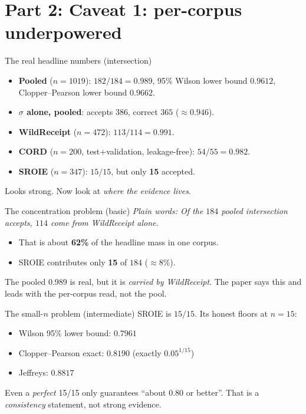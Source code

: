 \documentclass[aspectratio=169]{beamer}
\newcommand{\poolN}{1019}
\newcommand{\poolSigA}{386}
\newcommand{\poolSigC}{365}
\newcommand{\poolIntA}{184}
\newcommand{\poolIntC}{182}
\newcommand{\wrN}{472}
\newcommand{\wrIntA}{114}
\newcommand{\wrIntC}{113}
\newcommand{\rgSroieCPlo}{0.8190}
\newcommand{\rgSroieJeff}{0.8817}
\newcommand{\rgSroieWil}{0.7961}
\newcommand{\rgPoolWil}{0.9612}
\newcommand{\rgPoolCPlo}{0.9662}
\newcommand{\keybox}[1]{\begin{center}\colorbox{grey!15}{\parbox{0.92\linewidth}{\centering #1}}\end{center}}
\newcommand{\plain}[1]{\textit{\textcolor{sig}{Plain words:} #1}}
\begin{document}
\section{Part 2: Caveat 1: per-corpus underpowered}
\begin{frame}{The real headline numbers (intersection)}
\begin{itemize}
\item \textbf{Pooled} ($n{=}\poolN$): $\poolIntC/\poolIntA = 0.989$,
95\% Wilson lower bound \textbf{$\rgPoolWil$}, Clopper--Pearson lower
bound $\rgPoolCPlo$.
\item \textbf{$\sigma$ alone, pooled}: accepts $\poolSigA$, correct
$\poolSigC$ ($\approx 0.946$).
\item \textbf{WildReceipt} ($n{=}\wrN$): $\wrIntC/\wrIntA = 0.991$.
\item \textbf{CORD} ($n{=}200$, test+validation, leakage-free):
$54/55 = 0.982$.
\item \textbf{SROIE} ($n{=}347$): $15/15$, but only \textbf{15}
accepted.
\end{itemize}
\keybox{Looks strong. Now look at \emph{where the evidence lives}.}
\end{frame}

\begin{frame}{The concentration problem (basic)}
\plain{Of the $\poolIntA$ pooled intersection accepts, \textbf{$\wrIntA$}
come from WildReceipt alone.}
\vspace{0.6em}
\begin{itemize}
\item That is about \textbf{62\%} of the headline mass in one corpus.
\item SROIE contributes only \textbf{15} of $\poolIntA$ ($\approx 8\%$).
\end{itemize}
\keybox{The pooled 0.989 is real, but it is \emph{carried by
WildReceipt}. The paper says this and leads with the per-corpus read,
not the pool.}
\end{frame}

\begin{frame}{The small-$n$ problem (intermediate)}
SROIE is $15/15$. Its honest floors at $n{=}15$:
\begin{itemize}
\item Wilson 95\% lower bound: \textbf{$\rgSroieWil$}
\item Clopper--Pearson exact: \textbf{$\rgSroieCPlo$} (exactly
$0.05^{1/15}$)
\item Jeffreys: \textbf{$\rgSroieJeff$}
\end{itemize}
\vspace{0.4em}
\keybox{Even a \emph{perfect} 15/15 only guarantees ``about 0.80 or
better''. That is a \emph{consistency} statement, not strong evidence.}
\end{frame}
\end{document}
